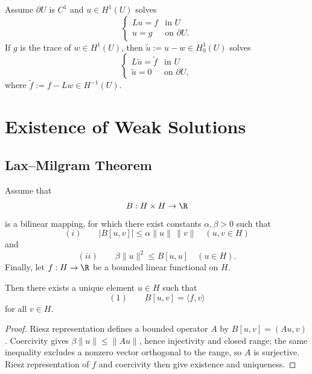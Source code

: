 \begin{remark}
\label{rem:nonzero-boundary-weak-solution}
Assume $\partial U$ is $C^1$ and $u\in H^1(U)$ solves
$$\begin{cases} Lu = f & \text{in } U \\ u = g & \text{on } \partial U. \end{cases}$$
If $g$ is the trace of $w\in H^1(U)$, then $\tilde u:=u-w\in H_0^1(U)$ solves
$$\begin{cases} L\tilde u = \tilde f & \text{in } U \\ \tilde u = 0 & \text{on } \partial U, \end{cases}$$
where $\tilde f := f - Lw \in H^{-1}(U)$.
\end{remark}

\section{Existence of Weak Solutions}
\label{sec:existence-of-weak-solutions}

\subsection{Lax--Milgram Theorem}

\begin{theorem}
\label{thm:lax-milgram-theorem}
Assume that
$$B : H \times H \to \R$$
is a bilinear mapping, for which there exist constants $\alpha,\beta > 0$ such that
$$(i) \qquad |B[u,v]| \leq \alpha\|u\| \, \|v\| \quad (u,v \in H)$$
and
$$(ii) \qquad \beta\|u\|^2 \leq B[u,u] \quad (u \in H).$$
Finally, let $f : H \to \R$ be a bounded linear functional on $H$.

Then there exists a unique element $u \in H$ such that
$$(1) \qquad B[u,v] = \langle f,v \rangle$$
for all $v \in H$.
\end{theorem}

\begin{proof}
\sketch Riesz representation defines a bounded operator $A$ by $B[u,v]=(Au,v)$. Coercivity gives $\beta\|u\|\le\|Au\|$, hence injectivity and closed range; the same inequality excludes a nonzero vector orthogonal to the range, so $A$ is surjective. Riesz representation of $f$ and coercivity then give existence and uniqueness.
\end{proof}


